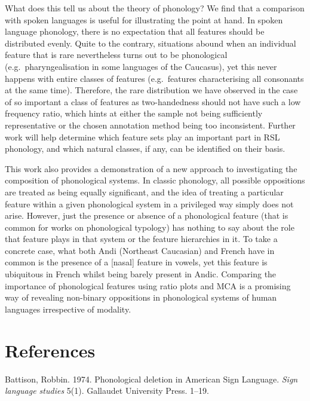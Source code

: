 What does this tell us about the theory of phonology? We find that a
comparison with spoken languages is useful for illustrating the point at
hand. In spoken language phonology, there is no expectation that all
features should be distributed evenly. Quite to the contrary, situations
abound when an individual feature that is rare nevertheless turns out to
be phonological (e.g.~pharyngealisation in some languages of the
Caucasus), yet this never happens with entire classes of features
(e.g.~features characterising all consonants at the same time).
Therefore, the rare distribution we have observed in the case of so
important a class of features as two-handedness should not have such a
low frequency ratio, which hints at either the sample not being
sufficiently representative or the chosen annotation method being too
inconsistent. Further work will help determine which feature sets play
an important part in RSL phonology, and which natural classes, if any,
can be identified on their basis.

This work also provides a demonstration of a new approach to
investigating the composition of phonological systems. In classic
phonology, all possible oppositions are treated as being equally
significant, and the idea of treating a particular feature within a
given phonological system in a privileged way simply does not arise.
However, just the presence or absence of a phonological feature (that is
common for works on phonological typology) has nothing to say about the
role that feature plays in that system or the feature hierarchies in it.
To take a concrete case, what both Andi (Northeast Caucasian) and French
have in common is the presence of a {[}nasal{]} feature in vowels, yet
this feature is ubiquitous in French whilst being barely present in
Andic. Comparing the importance of phonological features using ratio
plots and MCA is a promising way of revealing non-binary oppositions in
phonological systems of human languages irrespective of modality.

\hypertarget{references}{%
\section*{References}\label{references}}

\hypertarget{refs}{}
\leavevmode\hypertarget{ref-Battison:1974}{}%
Battison, Robbin. 1974. Phonological deletion in American Sign Language.
\emph{Sign language studies} 5(1). Gallaudet University Press. 1--19.

